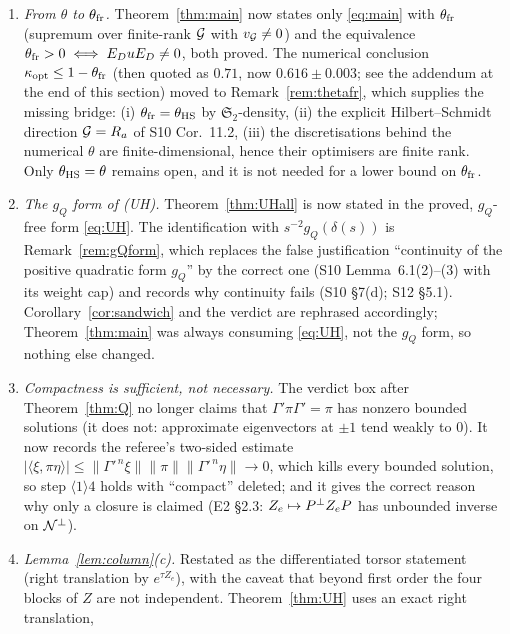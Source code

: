 \documentclass[11pt]{article}
\newcommand{\Stwo}{\mathfrak S_2}\newcommand{\Sone}{\mathfrak S_1}
\newcommand{\norm}[1]{\lVert #1\rVert}\newcommand{\abs}[1]{\lvert #1\rvert}
\newcommand{\ip}[2]{\langle #1,#2\rangle}\newcommand{\one}{\mathbf 1}
\begin{document}
\begin{enumerate}[leftmargin=2.6em,itemsep=2pt]
\item[\textbf{R1}] \emph{From $\theta$ to $\theta_{\rm fr}$.}  Theorem~\ref{thm:main} now states
 only \eqref{eq:main} with $\theta_{\rm fr}$ (supremum over finite-rank $\mathcal G$ with $v_\mathcal G\ne0$)
 and the equivalence $\theta_{\rm fr}>0\iff E_DuE_D\ne0$, both proved.  The numerical conclusion
 $\kappa_{\rm opt}\le1-\theta_{\rm fr}$ (then quoted as $0.71$, now $0.616\pm0.003$; see the
 addendum at the end of this section) moved to Remark~\ref{rem:thetafr}, which supplies the
 missing bridge:
 (i) $\theta_{\rm fr}=\theta_{\rm HS}$ by $\Stwo$-density, (ii) the explicit Hilbert--Schmidt
 direction $\mathcal G=R_a$ of S10 Cor.~11.2, (iii) the discretisations behind the numerical $\theta$
 are finite-dimensional, hence their optimisers are finite rank.  Only $\theta_{\rm HS}=\theta$
 remains open, and it is not needed for a lower bound on $\theta_{\rm fr}$.
\item[\textbf{R2}] \emph{The $g_Q$ form of (UH).}  Theorem~\ref{thm:UHall} is now stated in the
 proved, $g_Q$-free form \eqref{eq:UH}.  The identification with $s^{-2}g_Q(\delta(s))$ is
 Remark~\ref{rem:gQform}, which replaces the false justification ``continuity of the positive
 quadratic form $g_Q$'' by the correct one (S10 Lemma~6.1(2)--(3) with its weight cap) and
 records why continuity fails (S10 \S7(d); S12 \S5.1).  Corollary~\ref{cor:sandwich} and the
 verdict are rephrased accordingly; Theorem~\ref{thm:main} was always consuming
 \eqref{eq:UH}, not the $g_Q$ form, so nothing else changed.
\item[\textbf{R3}] \emph{Compactness is sufficient, not necessary.}  The verdict box after
 Theorem~\ref{thm:Q} no longer claims that $\Gamma'\pi\Gamma'=\pi$ has nonzero bounded solutions
 (it does not: approximate eigenvectors at $\pm1$ tend weakly to $0$).  It now records the
 referee's two-sided estimate $\abs{\ip\xi{\pi\eta}}\le\norm{\Gamma'^{\,n}\xi}\norm\pi
 \norm{\Gamma'^{\,n}\eta}\to0$, which kills every bounded solution, so step
 $\langle1\rangle4$ holds with ``compact'' deleted; and it gives the correct reason why only a
 closure is claimed (E2 \S2.3: $Z_e\mapsto P^{\perp} Z_eP$ has unbounded inverse on $\mathcal N^\perp$).
\item[\textbf{R4}] \emph{Lemma~\ref{lem:column}(c).}  Restated as the differentiated torsor
 statement (right translation by $e^{\tau Z_e}$), with the caveat that beyond first order the
 four blocks of $Z$ are not independent.  Theorem~\ref{thm:UH} uses an exact right translation,

\end{enumerate}
\end{document}
